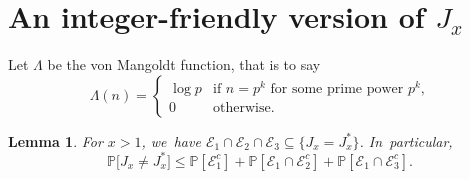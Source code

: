 \documentclass[10pt,a4paper]{article}
\newcommand{\PP}{\mathbb{P}}
\newcommand{\EC}{\mathcal{E}}
\newcommand{\bg}{\big}
\theoremstyle{plain}
\newtheorem{lem}[cor]{Lemma}
\theoremstyle{definition}
\begin{document}
\section{An integer-friendly version of \texorpdfstring{$J_x$}{Jx}}
\label{sec:integer friendly J}

Let $\Lambda$ be the von Mangoldt function, that is to say
\[
\Lambda(n) = \begin{cases}
\log p &\text{if $n = p^k$ for some prime power $p^k$,} \\
0 &\text{otherwise.}
\end{cases}
\]

\begin{lem}
\label{lem:decomposition J neq J*}
For $x > 1$, we~have $\EC_1\cap \EC_2\cap \EC_3\subseteq \{ J_x = J_x^*\}$. In~particular,
\[
\PP\bg[J_x \ne J_x^*\bg] \le \PP[\EC_1^c] + \PP[\EC_1 \cap \EC_2^c] + \PP[\EC_1 \cap \EC_3^c].
\]
\end{lem}
\end{document}
